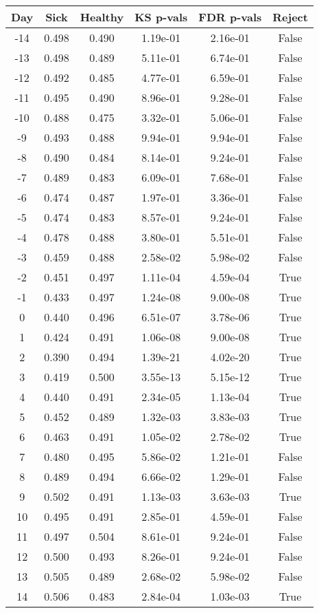 \begin{tabular}{c|c|c|c|c|c}
Day &  Sick & Healthy &  KS p-vals & FDR p-vals & Reject\\
\hline
-14 & 0.498 &   0.490 &   1.19e-01 &   2.16e-01 &  False\\
-13 & 0.498 &   0.489 &   5.11e-01 &   6.74e-01 &  False\\
-12 & 0.492 &   0.485 &   4.77e-01 &   6.59e-01 &  False\\
-11 & 0.495 &   0.490 &   8.96e-01 &   9.28e-01 &  False\\
-10 & 0.488 &   0.475 &   3.32e-01 &   5.06e-01 &  False\\
 -9 & 0.493 &   0.488 &   9.94e-01 &   9.94e-01 &  False\\
 -8 & 0.490 &   0.484 &   8.14e-01 &   9.24e-01 &  False\\
 -7 & 0.489 &   0.483 &   6.09e-01 &   7.68e-01 &  False\\
 -6 & 0.474 &   0.487 &   1.97e-01 &   3.36e-01 &  False\\
 -5 & 0.474 &   0.483 &   8.57e-01 &   9.24e-01 &  False\\
 -4 & 0.478 &   0.488 &   3.80e-01 &   5.51e-01 &  False\\
 -3 & 0.459 &   0.488 &   2.58e-02 &   5.98e-02 &  False\\
 -2 & 0.451 &   0.497 &   1.11e-04 &   4.59e-04 &   True\\
 -1 & 0.433 &   0.497 &   1.24e-08 &   9.00e-08 &   True\\
  0 & 0.440 &   0.496 &   6.51e-07 &   3.78e-06 &   True\\
  1 & 0.424 &   0.491 &   1.06e-08 &   9.00e-08 &   True\\
  2 & 0.390 &   0.494 &   1.39e-21 &   4.02e-20 &   True\\
  3 & 0.419 &   0.500 &   3.55e-13 &   5.15e-12 &   True\\
  4 & 0.440 &   0.491 &   2.34e-05 &   1.13e-04 &   True\\
  5 & 0.452 &   0.489 &   1.32e-03 &   3.83e-03 &   True\\
  6 & 0.463 &   0.491 &   1.05e-02 &   2.78e-02 &   True\\
  7 & 0.480 &   0.495 &   5.86e-02 &   1.21e-01 &  False\\
  8 & 0.489 &   0.494 &   6.66e-02 &   1.29e-01 &  False\\
  9 & 0.502 &   0.491 &   1.13e-03 &   3.63e-03 &   True\\
 10 & 0.495 &   0.491 &   2.85e-01 &   4.59e-01 &  False\\
 11 & 0.497 &   0.504 &   8.61e-01 &   9.24e-01 &  False\\
 12 & 0.500 &   0.493 &   8.26e-01 &   9.24e-01 &  False\\
 13 & 0.505 &   0.489 &   2.68e-02 &   5.98e-02 &  False\\
 14 & 0.506 &   0.483 &   2.84e-04 &   1.03e-03 &   True\\
\end{tabular}